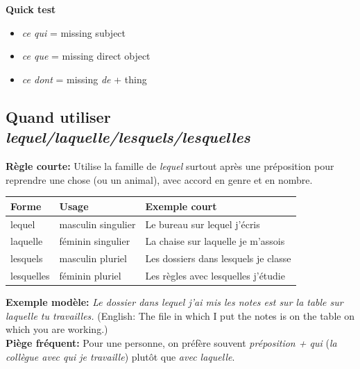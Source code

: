 \documentclass{article}
\begin{document}
\textbf{Quick test}
\begin{itemize}
    \item \textit{ce qui} = missing subject
    \item \textit{ce que} = missing direct object
    \item \textit{ce dont} = missing \textit{de} + thing
\end{itemize}

\subsection{Quand utiliser \textit{lequel/laquelle/lesquels/lesquelles}}
\textbf{Règle courte:} Utilise la famille de \textit{lequel} surtout après une préposition pour reprendre une chose (ou un animal), avec accord en genre et en nombre.
\begin{center}
    \begin{tabular}{|l|l|l|}
        \hline
        \textbf{Forme} & \textbf{Usage} & \textbf{Exemple court} \\
        \hline
        lequel & masculin singulier & Le bureau sur lequel j'écris \\
        \hline
        laquelle & féminin singulier & La chaise sur laquelle je m'assois \\
        \hline
        lesquels & masculin pluriel & Les dossiers dans lesquels je classe \\
        \hline
        lesquelles & féminin pluriel & Les règles avec lesquelles j'étudie \\
        \hline
    \end{tabular}
\end{center}
\textbf{Exemple modèle:} \textit{Le dossier dans lequel j'ai mis les notes est sur la table sur laquelle tu travailles.} (English: The file in which I put the notes is on the table on which you are working.) \\
\textbf{Piège fréquent:} Pour une personne, on préfère souvent \textit{préposition + qui} (\textit{la collègue avec qui je travaille}) plutôt que \textit{avec laquelle}.
\end{document}
